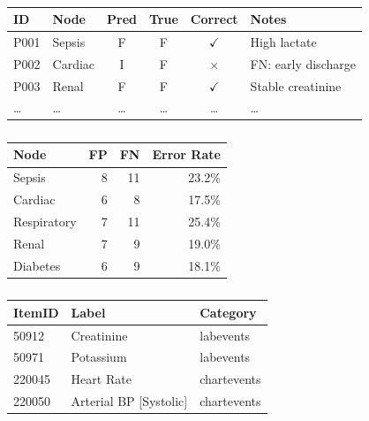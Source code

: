 \begin{table}[h]
\begin{englishblock}
\centering
\caption{}
\begin{tabular}{llcccl}
\toprule
ID & Node & Pred & True & Correct & Notes \\
\midrule
P001 & Sepsis & F & F & $\checkmark$ & High lactate \\
P002 & Cardiac & I & F & $\times$ & FN: early discharge \\
P003 & Renal & F & F & $\checkmark$ & Stable creatinine \\
\ldots & \ldots & \ldots & \ldots & \ldots & \ldots \\
\bottomrule
\end{tabular}
\label{tab:case_studies}
\end{englishblock}
\end{table}

\begin{table}[h]
\begin{englishblock}
\centering
\caption{}
\begin{tabular}{lrrr}
\toprule
Node & FP & FN & Error Rate \\
\midrule
Sepsis & 8 & 11 & 23.2\% \\
Cardiac & 6 & 8 & 17.5\% \\
Respiratory & 7 & 11 & 25.4\% \\
Renal & 7 & 9 & 19.0\% \\
Diabetes & 6 & 9 & 18.1\% \\
\bottomrule
\end{tabular}
\label{tab:error_analysis}
\end{englishblock}
\end{table}

\begin{table}[h]
\begin{englishblock}
\centering
\caption{}
\begin{tabular}{lll}
\toprule
ItemID & Label & Category \\
\midrule
50912 & Creatinine & labevents \\
50971 & Potassium & labevents \\
220045 & Heart Rate & chartevents \\
220050 & Arterial BP [Systolic] & chartevents \\
\bottomrule
\end{tabular}
\label{tab:itemid}
\end{englishblock}
\end{table}

